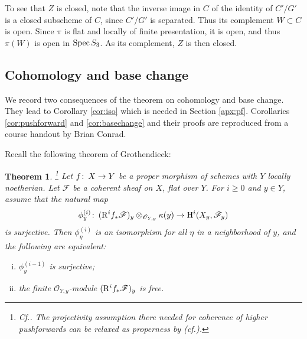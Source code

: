 \documentclass{gtpart}
\newtheorem{thm}{Theorem}
\theoremstyle{definition}
\theoremstyle{remark}
\def\co{\colon\thinspace}
\newcommand{\Spec}{{\rm Spec\thinspace}}
\newcommand{\cf}{cf.\thinspace}
\newcommand{\CO}{{\mathscr{O}}}
\newcommand{\CF}{{\mathscr{F}}}
\newcommand{\rt}{{\rm R}}
\newcommand{\ho}{{\rm H}}
\newcommand{\rf}{\kappa}
\newcommand{\f}{\phi}
\begin{document}
To see that $Z$ is closed, note that the inverse image in $C$ of the identity of $C'/G'$ is a closed subscheme of $C$, since $C'/G'$ is separated.  
Thus its complement $W \subset C$ is open.  
Since $\pi$ is flat and locally of finite presentation, it is open, and thus $\pi(W)$ is open in $\Spec S_3$.  
As its complement, $Z$ is then closed.  


\subsection{Cohomology and base change}
\label{apx:cbc}

We record two consequences of the theorem on cohomology and base change.  
They lead to Corollary \ref{cor:iso} which is needed in Section \ref{apx:pf}.  
Corollaries \ref{cor:pushforward} and \ref{cor:basechange} and their proofs are reproduced from a course handout by Brian Conrad.  

Recall the following theorem of Grothendieck: 
\begin{thm}
\label{thm:cbc}
 \footnote{Cf.\thinspace \cite[III.12.11]{AG}.  
 The projectivity assumption there needed for coherence of higher pushforwards can be relaxed as properness by \cite[3.2.1]{EGAIII} 
 (\cf \cite[III.12.2 and III.8.8.1]{AG}).  }
 Let $f \co X \to Y$ be a proper morphism of schemes with $Y$ locally noetherian.  
 Let $\CF$ be a coherent sheaf on $X$, flat over $Y$.  
 For $i \geq 0$ and $y \in Y$, assume that the natural map 
 \[
  \f_y^{(i)} \co (\rt^i f_* \CF)_y \otimes_{\CO_{Y,y}} \rf(y) \to \ho^i(X_y,\CF_y) 
 \]
 is surjective.  Then $\f_{\eta}^{(i)}$ is an isomorphism for all $\eta$ in a neighborhood of $y$, and the following are equivalent: 
 \begin{enumerate}[(i)]
 \item $\f_y^{(i-1)}$ is surjective; 

 \item the finite $\CO_{Y,y}$-module $(\rt^i f_* \CF)_y$ is free.  
 \end{enumerate}
\end{thm}
\end{document}
